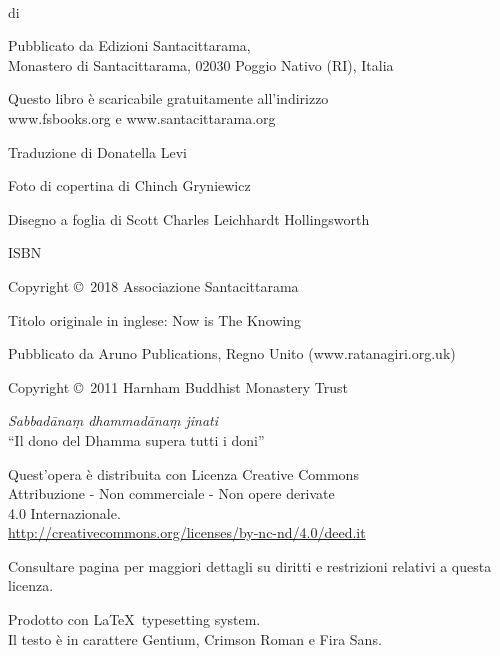 \cleartoverso
\thispagestyle{empty}

{\copyrightsize
\centering
\setlength{\parindent}{0pt}%
\setlength{\parskip}{0.8\baselineskip}%

\thetitle\\
di \theauthor

Pubblicato da Edizioni Santacittarama,\\
Monastero di Santacittarama, 02030 Poggio Nativo (RI), Italia

Questo libro è scaricabile gratuitamente all'indirizzo\\
www.fsbooks.org e www.santacittarama.org

Traduzione di Donatella Levi

Foto di copertina di Chinch Gryniewicz

Disegno a foglia di Scott Charles Leichhardt Hollingsworth

ISBN \theISBN

Copyright \copyright\ 2018 Associazione Santacittarama

Titolo originale in inglese: Now is The Knowing

Pubblicato da Aruno Publications, Regno Unito (www.ratanagiri.org.uk)

Copyright \copyright\ 2011 Harnham Buddhist Monastery Trust

\emph{Sabbadānaṃ dhammadānaṃ jinati}\\
``Il dono del Dhamma supera tutti i doni''

\vfill

{\footnotesize
Quest'opera è distribuita con Licenza Creative Commons\\
Attribuzione - Non commerciale - Non opere derivate\\
4.0 Internazionale.\\
\href{http://creativecommons.org/licenses/by-nc-nd/4.0/deed.it}{http://creativecommons.org/licenses/by-nc-nd/4.0/deed.it}

Consultare pagina \pageref{copyright-details} per maggiori dettagli su diritti e restrizioni relativi a questa licenza.

Prodotto con \LaTeX\ typesetting system.\\
Il testo è in carattere Gentium, Crimson Roman e Fira Sans.

\theEditionInfo

}}
